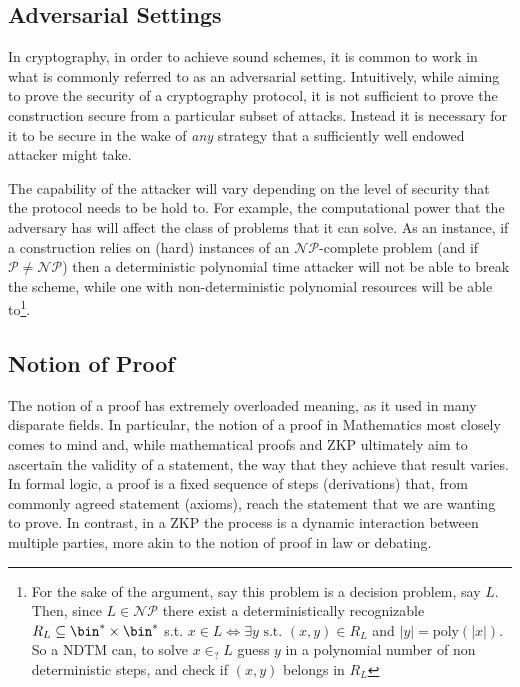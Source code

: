 \documentclass{article}
\begin{document}
\subsection{Adversarial Settings}
In cryptography, in order to achieve sound schemes, it is common to work in what is commonly referred to as an adversarial setting.
Intuitively, while aiming to prove the security of a cryptography protocol, it is not sufficient to prove the construction secure from a particular subset of attacks. Instead it is necessary for it to be secure in the wake of \textit{any} strategy that a sufficiently well endowed attacker might take. \par

The capability of the attacker will vary depending on the level of security that the protocol needs to be hold to. For example, the computational power that the adversary has will affect the class of problems that it can solve.
As an instance, if a construction relies on (hard) instances of an $\mathcal{NP}$-complete problem (and if $\mathcal{P} \neq \mathcal{NP}$) then a deterministic polynomial time attacker will not be able to break the scheme, while one with non-deterministic polynomial resources will be able to\footnote{For the sake of the argument, say this problem is a decision problem, say $L$. Then, since $L \in \mathcal{NP}$ there exist a deterministically recognizable $R_L \subseteq \bin^* \times \bin^* $ s.t. $x \in L \iff \exists y \text{ s.t. } (x, y) \in R_L$ and $|y| = \text{poly}(|x|)$. So a NDTM can, to solve $x \in_? L$ guess $y$ in a polynomial number of non deterministic steps, and check if $(x, y)$ belongs in $R_L$ }.


\subsection{Notion of Proof}
The notion of a proof has extremely overloaded meaning, as it used in many disparate fields. In particular, the notion of a proof in Mathematics most closely comes to mind and, while mathematical proofs and ZKP ultimately aim to ascertain the validity of a statement, the way that they achieve that result varies. In formal logic, a proof is a fixed sequence of steps (derivations) that, from commonly agreed statement (axioms), reach the statement that we are wanting to prove. In contrast, in a ZKP the process is a dynamic interaction between multiple parties, more akin to the notion of proof in law or debating. 
\end{document}
